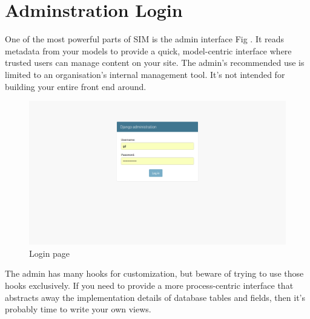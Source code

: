 \section{Adminstration Login}
One of the most powerful parts of SIM is the admin interface Fig . It reads metadata from your models to provide a quick, model-centric interface where trusted users can manage content on your site. The admin’s recommended use is limited to an organisation’s internal management tool. It’s not intended for building your entire front end around.

\begin{figure}[h!]                                                      
\begin{center}                                                          
\includegraphics[scale=0.35]{images/admin.png}                        
\caption{Login page}                            
\end{center}                                                            
\end{figure} 

The admin has many hooks for customization, but beware of trying to use those hooks exclusively. If you need to provide a more process-centric interface that abstracts away the implementation details of database tables and fields, then it’s probably time to write your own views.

